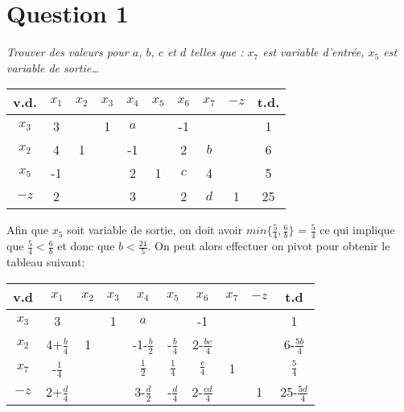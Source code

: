 \section*{Question 1}

\emph{Trouver des valeurs pour $a$, $b$, $c$ et $d$ telles que : $x_7$ est variable d’entrée, $x_5$ est variable de sortie\dots}
\begin{center}
	\renewcommand{\arraystretch}{1.5}
	\begin{tabular}{|c|cccccccc|c|}
		\hline
		v.d.  & $x_1$ & $x_2$ & $x_3$ & $x_4$ & $x_5$ & $x_6$ & $x_7$ & $-z$ & t.d. \\ \hline
		$x_3$ &   3   &       &   1   &  $a$  &       &  -1   &       &      &  1   \\
		$x_2$ &   4   &   1   &       &  -1   &       &   2   &  $b$  &      &  6   \\
		$x_5$ &  -1   &       &       &   2   &   1   &  $c$  &   4   &      &  5   \\ \hline
		$-z$  &   2   &       &       &   3   &       &   2   &  $d$  &  1   &  25  \\ \hline
	\end{tabular}
\end{center}

Afin que $x_5$ soit variable de sortie, on doit avoir $min \{\frac{5}{4}, \frac{6}{b}\}$ = $\frac{5}{4}$ ce qui implique que $\frac{5}{4} < \frac{6}{b}$ et donc que $b < \frac{24}{5}$. On peut alors effectuer on pivot pour obtenir le tableau suivant:

\begin{center}
	\renewcommand{\arraystretch}{1.5}
	\begin{tabular}{|c|cccccccc|c|}
		\hline
		 v.d  &      $x_1$      & $x_2$ & $x_3$ &      $x_4$       &     $x_5$      &      $x_6$       & $x_7$ & $-z$ &        t.d        \\ \hline
		$x_3$ &        3        &       &   1   &       $a$        &                &        -1        &       &      &         1         \\
		$x_2$ & 4+$\frac{b}{4}$ &   1   &       & -1-$\frac{b}{2}$ & -$\frac{b}{4}$ & 2-$\frac{bc}{4}$ &       &      & 6-$\frac{5b}{4}$  \\
		$x_7$ & -$\frac{1}{4}$  &       &       &  $\frac{1}{2}$   & $\frac{1}{4}$  &  $\frac{c}{4}$   &   1   &      &   $\frac{5}{4}$   \\ \hline
		$-z$  & 2+$\frac{d}{4}$ &       &       & 3-$\frac{d}{2}$  & -$\frac{d}{4}$ & 2-$\frac{cd}{4}$ &       &  1   & 25-$\frac{5d}{4}$ \\ \hline
	\end{tabular}
\end{center}

